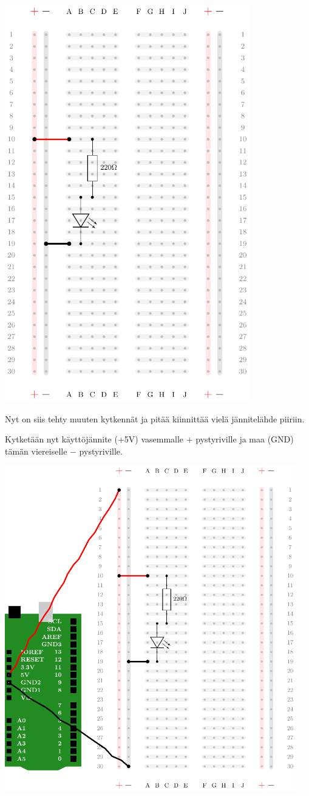 \includegraphics[width=0.8\textwidth]{kuvat/kuva4.pdf}


Nyt on siis tehty muuten kytkennät ja pitää kiinnittää vielä jännitelähde piiriin.

Kytketään nyt käyttöjännite (+5V) vasemmalle $+$ pystyriville ja maa (GND) tämän viereiselle $-$ pystyriville.

\includegraphics[width=0.95\textwidth]{kuvat/kuva5.pdf}

